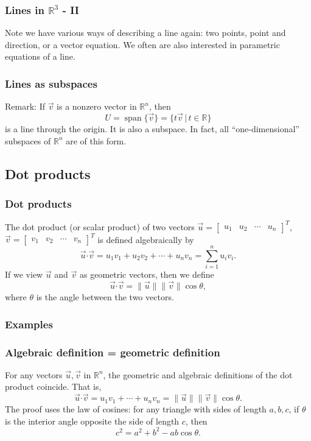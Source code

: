 \documentclass[11pt,t]{beamer}
\DeclareMathOperator{\spn}{span}
\newcommand{\R}{\mathbb{R}}
\newcommand{\len}[1]{\lVert #1\rVert}
\newcommand{\dotp}{\boldsymbol{\cdot}}
\begin{document}
\begin{frame}\frametitle{Lines in $\R^3$ - II}
 Note we have various ways of describing a line again: two points, point and \alert{direction}, or a vector equation. We often are also interested in \alert{parametric equations} of a line.
\end{frame}
\begin{frame}
\frametitle{Lines as subspaces}

\alert{Remark:} If $\vec{v}$ is a nonzero vector in $\R^n$, then
\[
U=\spn\{\vec{v}\} = \{t\vec{v} \,|\, t\in\R\}
\]
 is a line through the origin. It is also a \alert{subspace}. In fact, all ``one-dimensional'' subspaces of $\R^n$ are of this form.
\end{frame}
\subsection{Dot products}
\begin{frame}
\frametitle{Dot products}

The \alert{dot product} (or scalar product) of two vectors $\vec{u} = \begin{bmatrix}
u_1&u_2&\cdots &u_n
\end{bmatrix}^T$, $\vec{v} = \begin{bmatrix}
v_1&v_2&\cdots &v_n
\end{bmatrix}^T$ is defined \alert{algebraically} by
\[
\vec{u}\dotp \vec{v} = u_1v_1+u_2v_2+\cdots + u_nv_n = \sum_{i=1}^n u_iv_i.
\]
If we view $\vec{u}$ and $\vec{v}$ as \alert{geometric} vectors, then we define
\[
\vec{u}\dotp \vec{v} = \len{\vec{u}}\len{\vec{v}}\cos\theta,
\]
where $\theta$ is the angle between the two vectors.
\end{frame}
\begin{frame}
\frametitle{Examples}

\end{frame}
\begin{frame}
\frametitle{Algebraic definition = geometric definition}
\begin{theorem}
For any vectors $\vec{u} , \vec{v}$ in $\R^n$, the geometric and algebraic definitions  of the dot product coincide. That is,
\[
\vec{u}\dotp\vec{v} = u_1v_1+\cdots + u_nv_n = \len{\vec{u}}\len{\vec{v}}\cos\theta.
\]
The proof uses the \alert{law of cosines}: for any triangle with sides of length $a,b,c$, if $\theta$ is the interior angle opposite the side of length $c$, then
\[
c^2 = a^2+b^2-ab\cos\theta.
\]
\end{theorem}
\end{frame}
\end{document}
